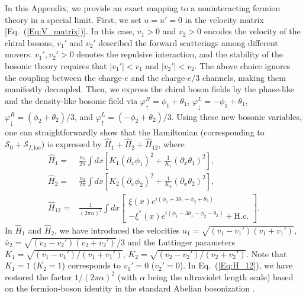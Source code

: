 \documentclass[aps,prx,amsmath,superscriptaddress,twocolumn,bibnotes,longbibliography,floatfix]{revtex4-2}
\begin{document}
	In this Appendix, we provide an exact mapping to a noninteracting fermion theory in a special limit.
	First, we set $u=u'=0$ in the velocity matrix [Eq.~(\ref{Eq:V_matrix})]. In this case,
	$v_1>0$ and $v_2>0$ encodes the velocity of the chiral bosons, $v_1'$ and $v_2'$ described the forward scatterings among different movers. $v_1',v_2'>0$ denotes the repulsive interaction, and the stability of the bosonic theory requires that $|v_1'|<v_1$ and $|v_2'|<v_2$.
	The above choice ignores the coupling between the charge-$e$ and the charge-$e/3$ channels, making them manifestly decoupled. Then, we express the chiral boson fields by the phase-like and the density-like bosonic field via $\varphi^R_{\uparrow}=\phi_1+\theta_1$, $\varphi^L_{\downarrow}=-\phi_1+\theta_1$, $\varphi^R_{\downarrow}=(\phi_2+\theta_2)/3$, and $\varphi^L_{\uparrow}=(-\phi_2+\theta_2)/3$. Using these new bosonic variables, one can straightforwardly show that the Hamiltonian (corresponding to $\mathcal{S}_0+\mathcal{S}_{I,\text{loc}}$) is expressed by $\hat{H}_1+\hat{H}_2+\hat{H}_{12}$, where
	\begin{subequations}
		\begin{align}
			\label{Eq:H_1}\hat{H}_1=&\frac{u_1}{2\pi}\int dx\left[K_1\left(\partial_x\phi_1\right)^2+\frac{1}{K_1}\left(\partial_x\theta_1\right)^2\right],\\
			\label{Eq:H_2}\hat{H}_2=&\frac{\bar{u}_2}{2\pi}\int dx\left[K_2\left(\partial_x\phi_2\right)^2+\frac{1}{K_2}\left(\partial_x\theta_2\right)^2\right],\\
			\label{Eq:H_12}\hat{H}_{12}=&\frac{1}{(2\pi\alpha)^2}\int dx\left[\begin{array}{c}
				\xi(x)e^{i(\phi_1+3\theta_1-\phi_2+\theta_2)}\\[1mm]
				-\xi^*(x)e^{i(\phi_1-3\theta_1-\phi_2-\theta_2)}+\text{H.c.}
			\end{array}\right].
		\end{align}
	\end{subequations}
	In $\hat{H}_1$ and $\hat{H}_2$, we have introduced the velocities $u_1=\sqrt{(v_1-v_1')(v_1+v_1')}$, $\bar{u}_2=\sqrt{(v_2-v_2')(v_2+v_2')}/3$ and the Luttinger parameters $K_1=\sqrt{(v_1-v_1')/(v_1+v_1')}$, $K_2=\sqrt{(v_2-v_2')/(v_2+v_2')}$. Note that $K_1=1$ ($K_2=1$) corresponds to $v_1'=0$ ($v_2'=0$). In Eq.~(\ref{Eq:H_12}), we have restored the factor $1/(2\pi\alpha)^2$ (with $\alpha$ being the ultraviolet length scale) based on the fermion-boson identity in the standard Abelian bosonization \cite{GiamarchiT2003,GogolinAO2004}.
\end{document}
